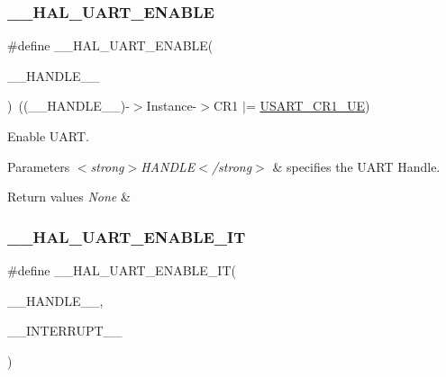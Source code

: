 \subsubsection{\texorpdfstring{\_\_HAL\_UART\_ENABLE}{\_\_HAL\_UART\_ENABLE}}
{\footnotesize\ttfamily \#define \+\_\+\+\_\+\+H\+A\+L\+\_\+\+U\+A\+R\+T\+\_\+\+E\+N\+A\+B\+LE(\begin{DoxyParamCaption}\item[{}]{\+\_\+\+\_\+\+H\+A\+N\+D\+L\+E\+\_\+\+\_\+ }\end{DoxyParamCaption})~((\+\_\+\+\_\+\+H\+A\+N\+D\+L\+E\+\_\+\+\_\+)-\/$>$Instance-\/$>$C\+R1 $\vert$= \mbox{\hyperlink{group___peripheral___registers___bits___definition_ga2bb650676aaae4a5203f372d497d5947}{U\+S\+A\+R\+T\+\_\+\+C\+R1\+\_\+\+UE}})}



Enable U\+A\+RT. 


\begin{DoxyParams}{Parameters}
{\em $<$strong$>$\+H\+A\+N\+D\+L\+E$<$/strong$>$} & specifies the U\+A\+RT Handle. \\
\hline
\end{DoxyParams}

\begin{DoxyRetVals}{Return values}
{\em None} & \\
\hline
\end{DoxyRetVals}
\mbox{\label{group___u_a_r_t___exported___macros_gaba94165ed584d49c1ec12df9819bd4bb}} 
\subsubsection{\texorpdfstring{\_\_HAL\_UART\_ENABLE\_IT}{\_\_HAL\_UART\_ENABLE\_IT}}
{\footnotesize\ttfamily \#define \+\_\+\+\_\+\+H\+A\+L\+\_\+\+U\+A\+R\+T\+\_\+\+E\+N\+A\+B\+L\+E\+\_\+\+IT(\begin{DoxyParamCaption}\item[{}]{\+\_\+\+\_\+\+H\+A\+N\+D\+L\+E\+\_\+\+\_\+,  }\item[{}]{\+\_\+\+\_\+\+I\+N\+T\+E\+R\+R\+U\+P\+T\+\_\+\+\_\+ }\end{DoxyParamCaption})}

